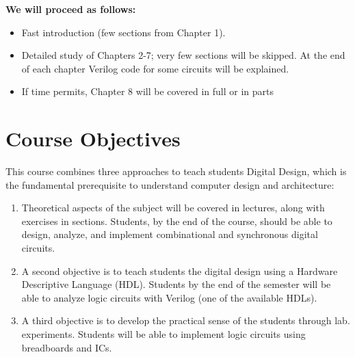 \vspace{2.5in}

\textbf{We will proceed as follows:}

\begin{itemize}
  \item Fast introduction (few sections from Chapter 1).

  \item Detailed study of Chapters 2-7; very few sections will be
  skipped. At the end of each chapter Verilog code for some circuits
  will be explained.

  \item If time permits, Chapter 8 will be covered in full or in parts
\end{itemize}

\clearpage

\chapter*{Course Objectives}
This course combines three approaches to teach students Digital
Design, which is the fundamental prerequisite to understand computer design and architecture:


\begin{enumerate}
  \item Theoretical aspects of the subject will be covered in
  lectures, along with exercises in sections. Students, by the end of
  the course, should be able to design, analyze, and implement
  combinational and synchronous digital circuits.

  \item A second objective is to teach students the digital design
  using a Hardware Descriptive Language (HDL). Students by the end of
  the semester will be able to analyze logic circuits with Verilog
  (one of the available HDLs).

  \item A third objective is to develop the practical sense of the
  students through lab. experiments. Students will be able to
  implement logic circuits using breadboards and ICs.
\end{enumerate}

\clearpage
{
\tiny
{}
\tableofcontents
}


